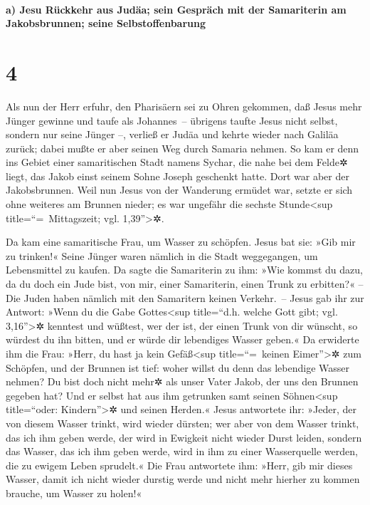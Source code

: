\hypertarget{a-jesu-ruxfcckkehr-aus-juduxe4a-sein-gespruxe4ch-mit-der-samariterin-am-jakobsbrunnen-seine-selbstoffenbarung}{%
\paragraph{a) Jesu Rückkehr aus Judäa; sein Gespräch mit der Samariterin
am Jakobsbrunnen; seine
Selbstoffenbarung}\label{a-jesu-ruxfcckkehr-aus-juduxe4a-sein-gespruxe4ch-mit-der-samariterin-am-jakobsbrunnen-seine-selbstoffenbarung}}

\hypertarget{section-3}{%
\section{4}\label{section-3}}

 Als nun der Herr erfuhr, den Pharisäern sei zu Ohren
gekommen, daß Jesus mehr Jünger gewinne und taufe als Johannes~--
 übrigens taufte Jesus nicht selbst, sondern nur seine
Jünger --,  verließ er Judäa und kehrte wieder nach
Galiläa zurück;  dabei mußte er aber seinen Weg durch
Samaria nehmen.  So kam er denn ins Gebiet einer
samaritischen Stadt namens Sychar, die nahe bei dem Felde✲ liegt, das
Jakob einst seinem Sohne Joseph geschenkt hatte.  Dort war
aber der Jakobsbrunnen. Weil nun Jesus von der Wanderung ermüdet war,
setzte er sich ohne weiteres am Brunnen nieder; es war ungefähr die
sechste Stunde\textless sup title=``=~Mittagszeit; vgl.
1,39''\textgreater✲.

 Da kam eine samaritische Frau, um Wasser zu schöpfen.
Jesus bat sie: »Gib mir zu trinken!«  Seine Jünger waren
nämlich in die Stadt weggegangen, um Lebensmittel zu kaufen.
 Da sagte die Samariterin zu ihm: »Wie kommst du dazu, da
du doch ein Jude bist, von mir, einer Samariterin, einen Trunk zu
erbitten?« -- Die Juden haben nämlich mit den Samaritern keinen
Verkehr.~--  Jesus gab ihr zur Antwort: »Wenn du die Gabe
Gottes\textless sup title=``d.h. welche Gott gibt; vgl.
3,16''\textgreater✲ kenntest und wüßtest, wer der ist, der einen Trunk
von dir wünscht, so würdest du ihn bitten, und er würde dir lebendiges
Wasser geben.«  Da erwiderte ihm die Frau: »Herr, du hast
ja kein Gefäß\textless sup title=``=~keinen Eimer''\textgreater✲ zum
Schöpfen, und der Brunnen ist tief: woher willst du denn das lebendige
Wasser nehmen?  Du bist doch nicht mehr✲ als unser Vater
Jakob, der uns den Brunnen gegeben hat? Und er selbst hat aus ihm
getrunken samt seinen Söhnen\textless sup title=``oder:
Kindern''\textgreater✲ und seinen Herden.«  Jesus
antwortete ihr: »Jeder, der von diesem Wasser trinkt, wird wieder
dürsten;  wer aber von dem Wasser trinkt, das ich ihm
geben werde, der wird in Ewigkeit nicht wieder Durst leiden, sondern das
Wasser, das ich ihm geben werde, wird in ihm zu einer Wasserquelle
werden, die zu ewigem Leben sprudelt.«  Die Frau
antwortete ihm: »Herr, gib mir dieses Wasser, damit ich nicht wieder
durstig werde und nicht mehr hierher zu kommen brauche, um Wasser zu
holen!«

